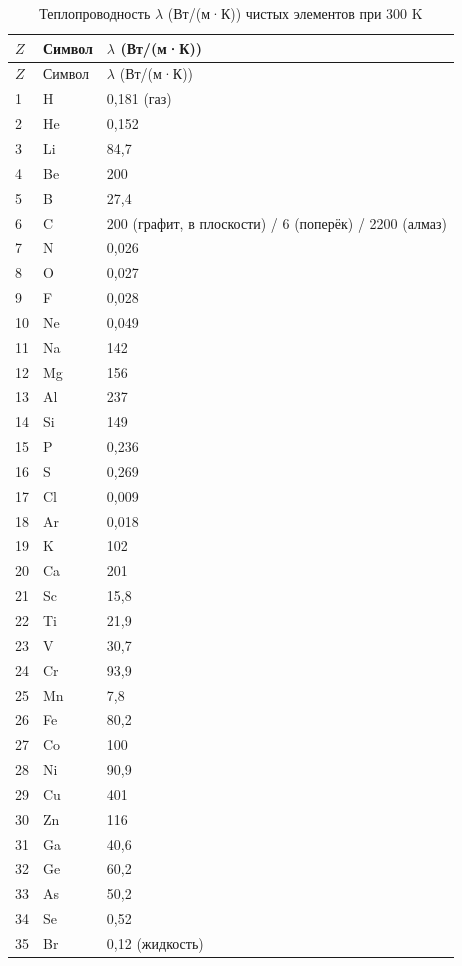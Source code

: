 \documentclass[12pt,a4paper]{article}
\begin{document}
	\begin{longtable}{p{0.6cm}p{1.2cm}p{1.5cm}}
		\caption{Теплопроводность \(\lambda\) (Вт/(м·К)) чистых элементов при 300 K} \label{tab:thermal-conductivity-all} \\
		\toprule
		\(Z\) & Символ & \(\lambda\) (Вт/(м·К)) \\
		\midrule
		\endfirsthead
		\toprule
		\(Z\) & Символ & \(\lambda\) (Вт/(м·К)) \\
		\midrule
		\endhead
		1  & H  & 0,181 (газ) \\
		2  & He & 0,152 \\
		3  & Li & 84,7 \\
		4  & Be & 200 \\
		5  & B  & 27,4 \\
		6  & C  & 200 (графит, в плоскости) / 6 (поперёк) / 2200 (алмаз) \\
		7  & N  & 0,026 \\
		8  & O  & 0,027 \\
		9  & F  & 0,028 \\
		10 & Ne & 0,049 \\
		11 & Na & 142 \\
		12 & Mg & 156 \\
		13 & Al & 237 \\
		14 & Si & 149 \\
		15 & P  & 0,236 \\
		16 & S  & 0,269 \\
		17 & Cl & 0,009 \\
		18 & Ar & 0,018 \\
		19 & K  & 102 \\
		20 & Ca & 201 \\
		21 & Sc & 15,8 \\
		22 & Ti & 21,9 \\
		23 & V  & 30,7 \\
		24 & Cr & 93,9 \\
		25 & Mn & 7,8 \\
		26 & Fe & 80,2 \\
		27 & Co & 100 \\
		28 & Ni & 90,9 \\
		29 & Cu & 401 \\
		30 & Zn & 116 \\
		31 & Ga & 40,6 \\
		32 & Ge & 60,2 \\
		33 & As & 50,2 \\
		34 & Se & 0,52 \\
		35 & Br & 0,12 (жидкость) \\

\end{longtable}
\end{document}
